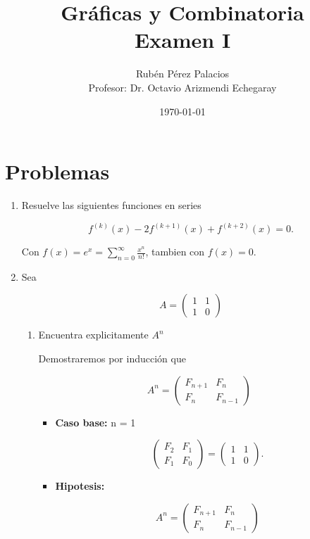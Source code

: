 \documentclass[letterpaper]{article}
\title{Gráficas y Combinatoria\\Examen I}
\author{Rubén Pérez Palacios\\Profesor: Dr. Octavio Arizmendi Echegaray}
\date{\today}
\theoremstyle{definition}
\theoremstyle{lemathm}
\theoremstyle{lemademthm}
\newcommand{\1}{\mathbbm{1}}
\begin{document}
	\maketitle
    
    \section*{Problemas}

	\begin{enumerate}

		\item Resuelve las siguientes funciones en series
		
		\[f^{(k)}(x) - 2f^{(k+1)}(x) + f^{(k+2)}(x) = 0.\]

		Con $f(x) = e^x = \sum_{n=0}^\infty \frac{x^n}{n!}$, tambien con $f(x) = 0$.

		\item Sea
		
		\[A = \begin{pmatrix}
			1 & 1\\
			1 & 0
		\end{pmatrix}\]

		\begin{enumerate}
			\item Encuentra explicitamente $A^n$
			
			Demostraremos por inducción que

			\[A^n = \begin{pmatrix}
				F_{n+1} & F_n\\
				F_n & F_{n-1}
			\end{pmatrix}\]

			\begin{itemize}
				\item \textbf{Caso base:} n = 1
				
				\[\begin{pmatrix}
					F_2 & F_1\\
					F_1 & F_0
				\end{pmatrix} =  \begin{pmatrix}
					1 & 1\\
					1 & 0
				\end{pmatrix}.\]

				\item \textbf{Hipotesis:}
				
				\[A^n = \begin{pmatrix}
					F_{n+1} & F_n\\
					F_n & F_{n-1}
				\end{pmatrix}\]


\end{itemize}
\end{enumerate}
\end{enumerate}
\end{document}
